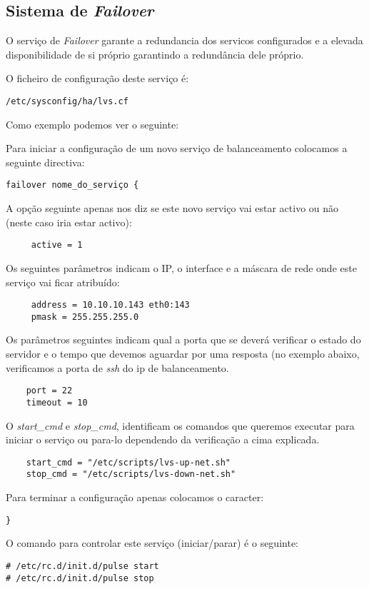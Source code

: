 \subsection{Sistema de \emph{Failover}}

O serviço de \emph{Failover} garante a redundancia dos servicos configurados e a elevada disponibilidade de si próprio garantindo a redundância dele próprio.

O ficheiro de configuração deste serviço é:

\begin{Verbatim}[commandchars=\\\{\}]
/etc/sysconfig/ha/lvs.cf
\end{Verbatim}

Como exemplo podemos ver o seguinte:

Para iniciar a configuração de um novo serviço de balanceamento colocamos a seguinte directiva:

\begin{verbatim}
failover nome_do_serviço {
\end{verbatim}

A opção seguinte apenas nos diz se este novo serviço vai estar activo ou não (neste caso iria estar activo):

\begin{verbatim}
     active = 1
\end{verbatim}

Os seguintes parâmetros indicam o IP, o interface e a máscara de rede onde este serviço vai ficar atribuído:

\begin{verbatim}
     address = 10.10.10.143 eth0:143
     pmask = 255.255.255.0
\end{verbatim}

Os parâmetros seguintes indicam qual a porta que se deverá verificar o estado do servidor e o tempo que devemos aguardar por uma resposta (no exemplo abaixo, verificamos a porta de \emph{ssh} do ip de balanceamento.

\begin{verbatim}
	port = 22
	timeout = 10
\end{verbatim}

O \emph{start\_cmd} e \emph{stop\_cmd}, identificam os comandos que queremos executar para iniciar o serviço ou para-lo dependendo da verificação a cima explicada.

\begin{verbatim}
	start_cmd = "/etc/scripts/lvs-up-net.sh"
	stop_cmd = "/etc/scripts/lvs-down-net.sh"
\end{verbatim}

Para terminar a configuração apenas colocamos o caracter:

\begin{verbatim}
}
\end{verbatim}

O comando para controlar este serviço (iniciar/parar) é o seguinte:

\begin{Verbatim}[commandchars=\\\{\}]
# /etc/rc.d/init.d/pulse start
# /etc/rc.d/init.d/pulse stop
\end{Verbatim}

